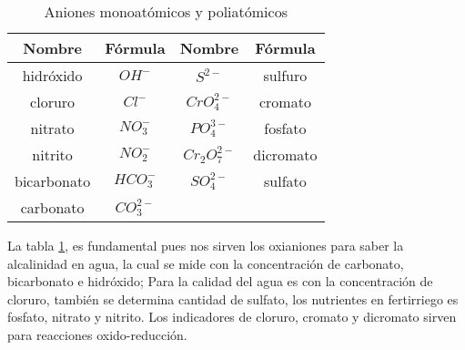 \begin{table}[h!]
	\centering
	\begin{tabular}{cccc}
		\hline
		Nombre      & Fórmula       & Nombre             & Fórmula   \\ \hline
		hidróxido   & $OH^{-}$      & $S^{2-}$           & sulfuro   \\
		cloruro     & $Cl^{-}$      & $CrO_{4}^{2-}$     & cromato   \\
		nitrato     & $NO_{3}^{-}$  & $PO_{4}^{3-}$      & fosfato   \\
		nitrito     & $NO_{2}^{-}$  & $Cr_{2}O_{7}^{2-}$ & dicromato \\
		bicarbonato & $HCO_{3}^{-}$ & $SO_{4}^{2-}$      & sulfato   \\
		carbonato   & $CO_{3}^{2-}$ &                    &           \\ \hline
	\end{tabular}
	\caption{Aniones monoatómicos y poliatómicos}
	\label{tabq1}
\end{table}

La tabla \ref{tabq1}, es fundamental pues nos sirven los oxianiones para saber la alcalinidad en agua,
la cual se mide con la concentración de carbonato, bicarbonato e hidróxido; Para la calidad del agua es con la concentración de cloruro,
también se determina cantidad de sulfato, los nutrientes en fertirriego es fosfato, nitrato y nitrito. Los indicadores de cloruro, cromato y
dicromato sirven para reacciones oxido-reducción.


